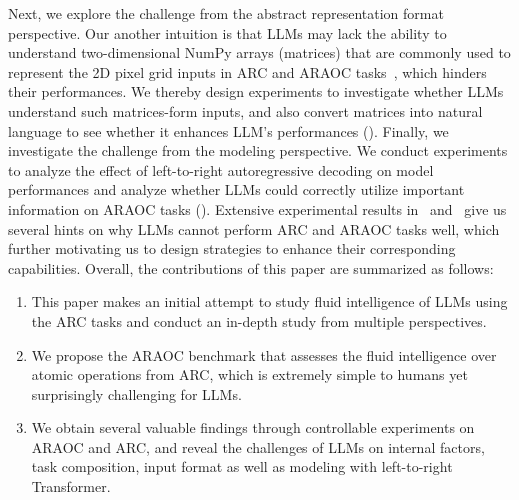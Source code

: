 
Next, we explore the challenge from the abstract representation format perspective. Our another intuition is that LLMs may lack the ability to understand two-dimensional NumPy arrays (matrices) that are commonly used to represent the 2D pixel grid inputs in ARC and ARAOC tasks~\cite{xullms,wang2023hypothesis}, which hinders their performances. We thereby design experiments to investigate whether LLMs understand such matrices-form inputs, and also convert matrices into natural language to see whether it enhances LLM's performances (). 
Finally, we investigate the challenge from the modeling perspective. We conduct experiments to analyze the effect of left-to-right autoregressive decoding on model performances and analyze whether LLMs could correctly utilize important information on ARAOC tasks (). Extensive experimental results in~ and~ give us several hints on why LLMs cannot perform ARC and ARAOC tasks well, which further motivating us to design strategies to enhance their corresponding capabilities. 
Overall, the contributions of this paper are summarized as follows:
\begin{enumerate}[noitemsep,nolistsep,leftmargin=*]
    \item This paper makes an initial attempt to study fluid intelligence of LLMs using the ARC tasks and conduct an in-depth study from multiple perspectives.
    \item We propose the ARAOC benchmark that assesses the fluid intelligence over atomic operations from ARC, which is extremely simple to humans yet surprisingly challenging for LLMs.
    \item We obtain several valuable findings through controllable experiments on ARAOC and ARC, and reveal the challenges of LLMs on internal factors, task composition, input format as well as modeling with left-to-right Transformer. 
\end{enumerate}

